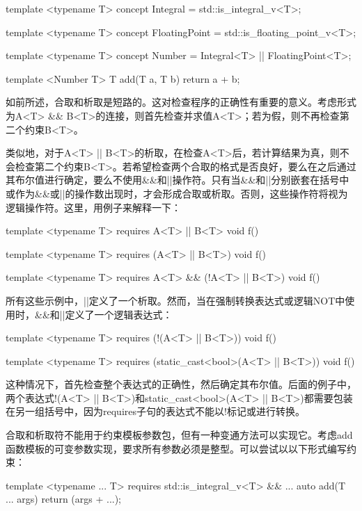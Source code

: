 \begin{cpp}
template <typename T>
concept Integral = std::is_integral_v<T>;

template <typename T>
concept FloatingPoint = std::is_floating_point_v<T>;

template <typename T>
concept Number = Integral<T> || FloatingPoint<T>;

template <Number T>
T add(T a, T b)
{
	return a + b;
}
\end{cpp}

如前所述，合取和析取是短路的。这对检查程序的正确性有重要的意义。考虑形式为A<T> \&\& B<T>的连接，则首先检查并求值A<T>；若为假，则不再检查第二个约束B<T>。

类似地，对于A<T> || B<T>的析取，在检查A<T>后，若计算结果为真，则不会检查第二个约束B<T>。若希望检查两个合取的格式是否良好，要么在之后通过其布尔值进行确定，要么不使用\&\&和||操作符。只有当\&\&和||分别嵌套在括号中或作为\&\&或||的操作数出现时，才会形成合取或析取。否则，这些操作符将视为逻辑操作符。这里，用例子来解释一下：

\begin{cpp}
template <typename T>
requires A<T> || B<T>
void f() {}

template <typename T>
requires (A<T> || B<T>)
void f() {}

template <typename T>
requires A<T> && (!A<T> || B<T>)
void f() {}
\end{cpp}

所有这些示例中，||定义了一个析取。然而，当在强制转换表达式或逻辑NOT中使用时，\&\&和||定义了一个逻辑表达式：

\begin{cpp}
template <typename T>
requires (!(A<T> || B<T>))
void f() {}

template <typename T>
requires (static_cast<bool>(A<T> || B<T>))
void f() {}
\end{cpp}

这种情况下，首先检查整个表达式的正确性，然后确定其布尔值。后面的例子中，两个表达式!(A<T> || B<T>)和static\_cast<bool>(A<T> || B<T>)都需要包装在另一组括号中，因为requires子句的表达式不能以!标记或进行转换。

合取和析取符不能用于约束模板参数包，但有一种变通方法可以实现它。考虑add函数模板的可变参数实现，要求所有参数必须是整型。可以尝试以以下形式编写约束：

\begin{cpp}
template <typename ... T>
requires std::is_integral_v<T> && ...
auto add(T ... args)
{
	return (args + ...);
}
\end{cpp}

